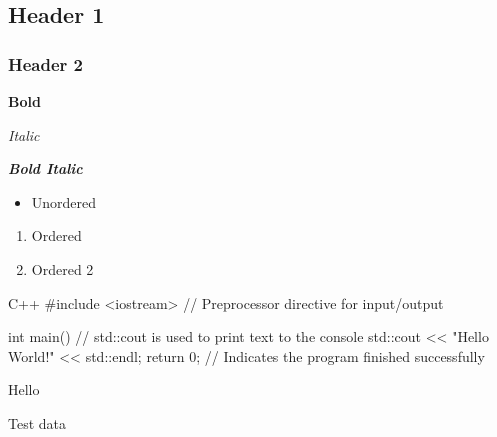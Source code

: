 \subsection*{Header 1}

\subsubsection*{Header 2}

\textbf{Bold}

\textit{Italic}

\textit{\textbf{Bold Italic}}

\begin{itemize}
  \item Unordered
\end{itemize}

\begin{enumerate}
  \item Ordered
  \item Ordered 2
\end{enumerate}


\begin{notebookcodeblock}{C++}{}
#include <iostream>  // Preprocessor directive for input/output

int main() {
    // std::cout is used to print text to the console
    std::cout << "Hello World!" << std::endl; 
    return 0; // Indicates the program finished successfully
}
\end{notebookcodeblock}

Hello

Test data

